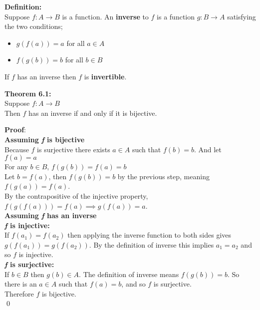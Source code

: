 \documentclass{report}
\newenvironment{frameblue}[1][BlueViolet]
  {\begin{tcolorbox}[colframe=#1,colback=white]}
  {\end{tcolorbox}}
\newenvironment{frameblack}[1][Black]
  {\begin{tcolorbox}[colframe=#1,colback=white]}
  {\end{tcolorbox}}
\newenvironment{framered}[1][Maroon]
  {\begin{tcolorbox}[colframe=#1,colback=white]}
  {\end{tcolorbox}}
\begin{document}
\begin{frameblue}
    \textbf{Definition:}\\
    Suppose $f : A \rightarrow B$ is a function. An \textbf{inverse} to $f$ is a function $g : B \rightarrow A$ satisfying the two conditions;
    \begin{itemize}
        \item $g(f(a)) = a$ for all $a \in A$
        \item $f(g(b)) = b$ for all $b \in B$
    \end{itemize}
    If $f$ has an inverse then $f$ is \textbf{invertible}.
\end{frameblue}

\begin{framered}
    \textbf{Theorem 6.1:}\\
    Suppose $f : A \rightarrow B$\\
    Then $f$ has an inverse if and only if it is bijective.
\end{framered}

\begin{frameblack}
    \textbf{Proof}:\\
    
    \textbf{Assuming \textit{f} is bijective}\\
    Because $f$ is surjective there exists $a \in A$ such that $f(b) = b$. And let $f(a) = a$\\
    For any $b \in B$, $f(g(b)) = f(a) = b$\\
    Let $b = f(a)$, then $f(g(b)) = b$ by the previous step, meaning $f(g(a)) = f(a)$.\\
    By the contrapositive of the injective property, $f(g(f(a))) = f(a) \implies g(f(a)) = a$.\\

    \textbf{Assuming \textit{f} has an inverse}\\
    \textbf{\textit{f} is injective:}\\
    If $f(a_1) = f(a_2)$ then applying the inverse function to both sides gives $g(f(a_1)) = g(f(a_2))$. By the definition of inverse this implies $a_1 = a_2$ and so $f$ is injective.\\
    \textbf{\textit{f} is surjective:}\\
    If $b \in B$ then $g(b) \in A$. The definition of inverse means $f(g(b)) = b$. So there is an $a \in A$ such that $f(a) = b$, and so $f$ is surjective.\\
    Therefore $f$ is bijective.\\
    \qed
    \end{frameblack}
\end{document}
